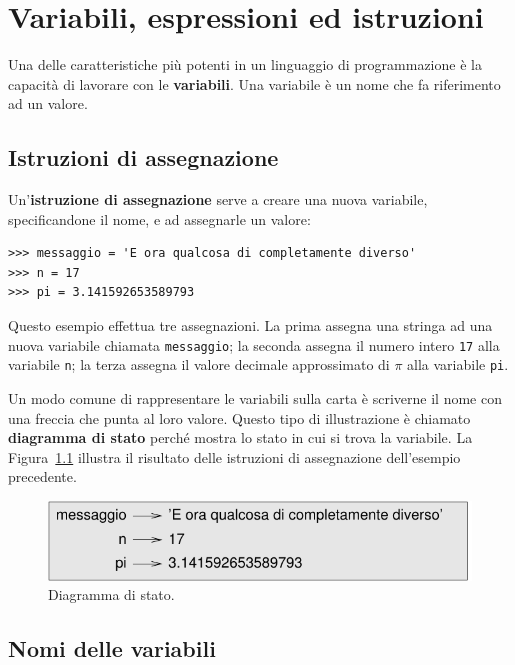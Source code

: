 \documentclass[10pt]{book}
\begin{document}
\chapter{Variabili, espressioni ed istruzioni}

Una delle caratteristiche più potenti in un linguaggio di programmazione è la capacità di lavorare con le {\bf variabili}. Una variabile è un nome che fa riferimento ad un valore.

\section{Istruzioni di assegnazione}
\label{variables}

Un'{\bf istruzione di assegnazione} serve a creare una nuova variabile, specificandone il nome, e ad assegnarle un valore:

\begin{verbatim}
>>> messaggio = 'E ora qualcosa di completamente diverso'
>>> n = 17
>>> pi = 3.141592653589793
\end{verbatim}
%
Questo esempio effettua tre assegnazioni. La prima assegna una stringa
ad una nuova variabile chiamata {\tt messaggio}; la seconda assegna il numero intero {\tt 17} alla variabile {\tt n}; la terza assegna il valore decimale approssimato di $\pi$ alla variabile {\tt pi}.

Un modo comune di rappresentare le variabili sulla carta è scriverne il nome con una freccia che punta al loro valore. Questo tipo di illustrazione è chiamato {\bf diagramma di stato} perché mostra lo stato in cui si trova la variabile. La Figura~\ref{fig.state2} illustra il risultato delle istruzioni di assegnazione dell'esempio precedente.

\begin{figure}
\centerline
{\includegraphics[scale=0.8]{figs/state2.pdf}}
\caption{Diagramma di stato.}
\label{fig.state2}
\end{figure}

\section{Nomi delle variabili}
\end{document}
